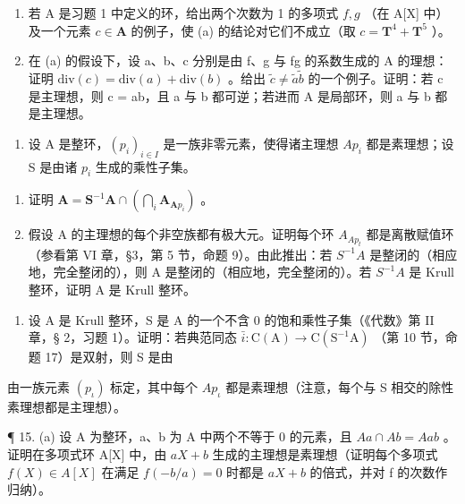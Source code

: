 \begin{enumerate}
\def\labelenumi{(\alph{enumi})}
\setcounter{enumi}{1}
\item
  若 A 是习题 1 中定义的环，给出两个次数为 1 的多项式 \(f, g\) （在 A{[}X{]} 中）及一个元素 \(c \in \mathbf{A}\) 的例子，使 (a) 的结论对它们不成立（取 \(c = \mathbf{T}^4 + \mathbf{T}^5\) ）。
\item
  在 (a) 的假设下，设 a、b、c 分别是由 f、g 与 fg 的系数生成的 A 的理想：证明 \(\text{div}(c) = \text{div}(a) + \text{div}(b)\) 。给出 \(\tilde{c} \neq \tilde{a}\tilde{b}\) 的一个例子。证明：若 c 是主理想，则 c = ab，且 a 与 b 都可逆；若进而 A 是局部环，则 a 与 b 都是主理想。
\end{enumerate}

\begin{enumerate}
\def\labelenumi{\arabic{enumi}.}
\setcounter{enumi}{12}
\tightlist
\item
  设 A 是整环，\((p_{i})_{i\in I}\) 是一族非零元素，使得诸主理想 \(Ap_{i}\) 都是素理想；设 S 是由诸 \(p_{i}\) 生成的乘性子集。
\end{enumerate}

\begin{enumerate}
\def\labelenumi{(\alph{enumi})}
\item
  证明 \(\mathbf{A} = \mathbf{S}^{-1}\mathbf{A}\cap \left(\bigcap_{i}\mathbf{A}_{\mathbf{A}p_i}\right)\) 。
\item
  假设 A 的主理想的每个非空族都有极大元。证明每个环 \(A_{Ap_{t}}\) 都是离散赋值环（参看第 VI 章，§3，第 5 节，命题 9）。由此推出：若 \(S^{-1}A\) 是整闭的（相应地，完全整闭的），则 A 是整闭的（相应地，完全整闭的）。若 \(S^{-1}A\) 是 Krull 整环，证明 A 是 Krull 整环。
\end{enumerate}

\begin{enumerate}
\def\labelenumi{\arabic{enumi}.}
\setcounter{enumi}{13}
\tightlist
\item
  设 A 是 Krull 整环，S 是 A 的一个不含 0 的饱和乘性子集（《代数》第 II 章，§ 2，习题 1）。证明：若典范同态 \(\bar{i}\colon\mathrm{C}(\mathrm{A})\to\mathrm{C}(\mathrm{S}^{-1}\mathrm{A})\) （第 10 节，命题 17）是双射，则 S 是由
\end{enumerate}
\relax{}

由一族元素 \((p_{\iota})\) 标定，其中每个 \(A p_{\iota}\) 都是素理想（注意，每个与 S 相交的除性素理想都是主理想）。

¶ 15. (a) 设 A 为整环，a、b 为 A 中两个不等于 0 的元素，且 \(Aa \cap Ab = Aab\) 。证明在多项式环 A{[}X{]} 中，由 \(aX + b\) 生成的主理想是素理想（证明每个多项式 \(f(X) \in A[X]\) 在满足 \(f(-b/a) = 0\) 时都是 \(aX + b\) 的倍式，并对 f 的次数作归纳）。

